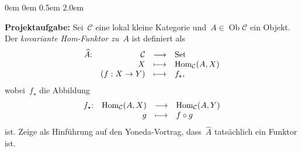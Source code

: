 \documentclass[a4paper,ngerman]{scrartcl}
\theoremstyle{definition}
\theoremstyle{plain}
\theoremstyle{remark}
\newcommand{\C}{\mathcal{C}}
\newcommand{\Hom}{\mathrm{Hom}}
\newcommand{\Set}{\mathrm{Set}}
\DeclareMathOperator{\Ob}{Ob}
\begin{document}
\begin{list}{}{0em \leftmargin0em \itemindent0.5em \itemsep 2.0em}
\small
\item[\textbf{Projektaufgabe:}]
Sei~$\C$ eine lokal kleine Kategorie und~$A \in \Ob \C$ ein Objekt. Der \emph{kovariante
Hom-Funktor zu~$A$} ist definiert als
\[ \begin{array}{@{}rrcl@{}}
  \widehat A{:} & \C &\longrightarrow& \Set \\
  & X &\longmapsto& \Hom_\C(A,X) \\
  & (f: X \to Y) &\longmapsto& f_\star,
\end{array} \]
wobei~$f_\star$ die Abbildung
\[ \begin{array}{@{}rrcl@{}}
  f_\star{:} & \Hom_\C(A,X) &\longrightarrow& \Hom_\C(A,Y) \\
  & g &\longmapsto& f \circ g
\end{array} \]
ist. Zeige als Hinführung auf den Yoneda-Vortrag, dass~$\widehat A$ tatsächlich
ein Funktor ist.
\end{list}
\end{document}
